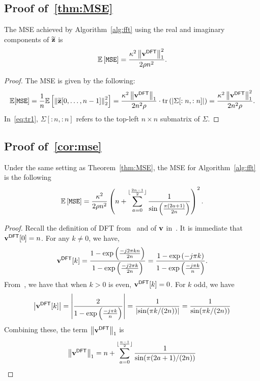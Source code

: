 \subsection{Proof of~\cref{thm:MSE}}\label{app:ssec:MSE}
\begin{namedtheorem}
The MSE achieved by Algorithm~\ref{alg:fft} using the real and imaginary components of $\widetilde{\mathbf{z}}$ is
$$\mathbb{E}\left[\texttt{MSE}\right]=\frac{\kappa^2\left\|\mathbf{v}^{\sf DFT}\right\|_1^2}{2\rho n^2}.$$
\end{namedtheorem}
\begin{proof}
The MSE is given by the following: 
\begin{equation}
    \mathbb{E}[\texttt{MSE}]=\frac{1}{n}\mathbb{E}\left[\left\|\widetilde{\mathbf{z}}[0,\ldots,n-1]\right\|_2^2\right]=\frac{\kappa^2\left\|\mathbf{v}^{\sf DFT}\right\|_1}{2n^2\rho}\cdot\mathrm{tr}\left(|\Sigma[:n,:n]|\right)=\frac{\kappa^2\left\|\mathbf{v}^{\sf DFT}\right\|_1^2}{2n^2\rho}.
    \label{eq:tr1}
\end{equation}
In~\eqref{eq:tr1}, $\Sigma[:n,:n]$ refers to the top-left $n\times n$ submatrix of $\Sigma$.
\end{proof}

\subsection{Proof of~\cref{cor:mse}}\label{app:ssec:mse}
\begin{namedcorollary}
Under the same setting as Theorem~\ref{thm:MSE}, the MSE for Algorithm~\ref{alg:fft} is the following
$$\mathbb{E}\left[\texttt{MSE}\right]=\frac{\kappa^2}{2\rho n^2}\left(n+\sum\limits_{a=0}^{\lfloor\frac{2n-1}{2}\rfloor}\frac{1}{\sin\left(\frac{\pi(2a+1)}{2n}\right)}\right)^2.$$
\end{namedcorollary}

\begin{proof}
Recall the definition of DFT from~ and of $\mathbf{v}$ in~. It is immediate that $\mathbf{v}^{\sf DFT}[0]=n$. For any $k\neq 0$, we have,
\begin{equation}
    \mathbf{v}^{\sf DFT}[k]=\frac{1-\exp\left(\frac{-j2\pi k n}{2n}\right)}{1-\exp\left(\frac{-j2\pi k}{2n}\right)}=\frac{1-\exp\left({-j\pi k }\right)}{1-\exp\left(\frac{-j\pi k}{n}\right)}.
    \label{eq:f2}
\end{equation}
From~, we have that when $k>0$ is even, $\mathbf{v}^{\sf DFT}[k]=0$. For $k$ odd, we have
\begin{equation}
    \left|\mathbf{v}^{\sf DFT}[k]\right|=\left|\frac{2}{1-\exp\left(\frac{-j\pi k}{n}\right)}\right|=\frac{1}{\left|\sin(\pi k/(2n))\right|}=\frac{1}{\sin(\pi k/(2n))}
    \label{eq:f3}
\end{equation}
Combining these, the term $\left\|\mathbf{v}^{\sf DFT}\right\|_1$ is
\begin{equation}
    \left\|\mathbf{v}^{\sf DFT}\right\|_1=n+\sum\limits_{a=0}^{\lfloor\frac{n-1}{2}\rfloor}\frac{1}{\sin(\pi(2a+1)/(2n))}
\end{equation}
\end{proof}

